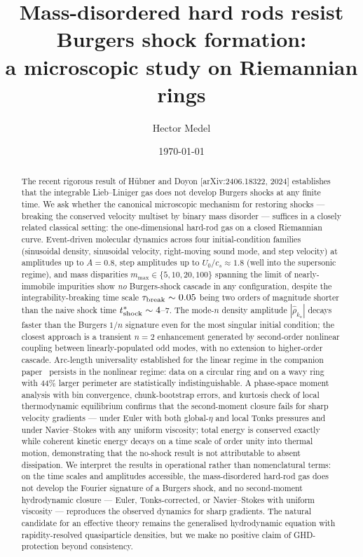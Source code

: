 \documentclass[aps,pre,twocolumn,superscriptaddress,longbibliography,floatfix]{revtex4-2}
\begin{document}
\title{Mass-disordered hard rods resist Burgers shock formation:\\
a microscopic study on Riemannian rings}

\author{Hector Medel}

\date{\today}

\begin{abstract}
The recent rigorous result of H\"ubner and Doyon
[arXiv:2406.18322, 2024] establishes that the integrable
Lieb--Liniger gas does not develop Burgers shocks at any finite
time. We ask whether the canonical microscopic mechanism for
restoring shocks --- breaking the conserved velocity multiset
by binary mass disorder --- suffices in a closely related
classical setting: the one-dimensional hard-rod gas on a closed
Riemannian curve. Event-driven molecular dynamics across four
initial-condition families (sinusoidal density, sinusoidal
velocity, right-moving sound mode, and step velocity) at
amplitudes up to $A=0.8$, step amplitudes up to
$U_0/c_s\approx 1.8$ (well into the supersonic regime), and mass
disparities $m_{\max}\in\{5,10,20,100\}$ spanning the limit of
nearly-immobile impurities show \emph{no} Burgers-shock
cascade in any configuration, despite the integrability-breaking
time scale
$\tau_{\rm break}\sim 0.05$ being two orders of magnitude shorter
than the naive shock time $t^*_{\rm shock}\sim 4$--$7$. The
mode-$n$ density amplitude $|\hat\rho_{k_n}|$ decays faster than
the Burgers $1/n$ signature even for the most singular initial
condition; the closest approach is a transient $n=2$ enhancement
generated by second-order nonlinear coupling between
linearly-populated odd modes, with no extension to
higher-order cascade. Arc-length universality
established for the linear regime in the companion
paper~\cite{PaperI} persists in the nonlinear regime: data
on a circular ring and on a wavy ring with $44\%$ larger
perimeter are statistically indistinguishable. A phase-space
moment analysis with bin convergence, chunk-bootstrap errors,
and kurtosis check of local thermodynamic equilibrium confirms
that the second-moment closure fails for sharp velocity
gradients --- under Euler with both global-$\eta$ and local
Tonks pressures and under Navier--Stokes with any uniform
viscosity; total energy is conserved exactly while coherent
kinetic energy decays on a time scale of order unity into
thermal motion, demonstrating that the no-shock result is not
attributable to absent dissipation. We interpret the results in operational rather than
nomenclatural terms: on the time scales and amplitudes
accessible, the mass-disordered hard-rod gas does not develop
the Fourier signature of a Burgers shock, and no second-moment
hydrodynamic closure --- Euler, Tonks-corrected, or
Navier--Stokes with uniform viscosity --- reproduces the
observed dynamics for sharp gradients. The natural candidate
for an effective theory remains the generalised hydrodynamic
equation with rapidity-resolved quasiparticle densities, but
we make no positive claim of GHD-protection beyond consistency.
\end{abstract}
\end{document}
